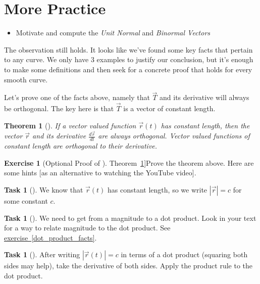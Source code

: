 \documentclass[10pt,]{book}
\theoremstyle{plain}
\newtheorem{theorem}{Theorem}[section]
\theoremstyle{definition}
\theoremstyle{definition}
\theoremstyle{definition}
\theoremstyle{definition}
\newtheorem{exploration}[project]{Exercise}
\newtheorem{task}[project]{Task}
\theoremstyle{definition}
\numberwithin{equation}{section}
\newcommand{\ds}{\displaystyle}
\begin{document}
\section[{More Practice}]{More Practice}\label{section-27}
\leavevmode%
\begin{itemize}[label=\textbullet]
\item{}Motivate and compute the \emph{Unit Normal} and \emph{Binormal Vectors}%
\end{itemize}
The observation still holds. It looks like we've found some key facts that pertain to any curve. We only have 3 examples to justify our conclusion, but it's enough to make some definitions and then seek for a concrete proof that holds for every smooth curve.%
\par
Let's prove one of the facts above, namely that \(\vec T\) and its derivative will always be orthogonal. The key here is that \(\vec T\) is a vector of constant length.%
\begin{theorem}[{}]\label{vector_valued_functions_of_constant_length}
If a vector valued function \(\vec r(t)\) has constant length, then the vector \(\vec r\) and its derivative \(\ds\frac{d\vec r}{dt}\) are always orthogonal. Vector valued functions of constant length are orthogonal to their derivative.%
\end{theorem}
\begin{exploration}[Optional Proof of \hyperref[vector_valued_functions_of_constant_length]{Theorem~\ref{vector_valued_functions_of_constant_length}}]\label{exploration-176}
Prove the theorem above. Here are some hints [as an alternative to watching the YouTube video]. \leavevmode%
\begin{itemize}[label=\textbullet]
\begin{task}[]\label{task-432}
We know that \(\vec r(t)\) has constant length, so we write \(|\vec r|=c\) for some constant \(c\).%
\end{task}
\begin{task}[]\label{task-433}
We need to get from a magnitude to a dot product. Look in your text for a way to relate magnitude to the dot product. See \hyperref[dot_product_facts]{exercise~\ref{dot_product_facts}}.%
\end{task}
\begin{task}[]\label{task-434}
After writing \(|\vec r(t)|=c\) in terms of a dot product (squaring both sides may help), take the derivative of both sides. Apply the product rule to the dot product.%
\end{task}
\end{itemize}
%
\end{exploration}
\end{document}
